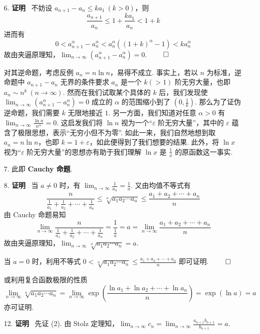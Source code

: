 \documentclass[11pt,oneside,fontset=fandol]{ctexbook} %
\begin{document}
\begin{enumerate}
    \item[6.]
    \textbf{证明} \ 不妨设 $a_{n+1}-a_n \leqslant k a_1 \ (k>0)$，则
    \[
        \frac{a_{n+1}}{a_n} \leqslant 1 + \frac{ka_1}{a_n} < 1 + k
    \]
    进而有
    \[
        0 < a_{n+1}^{\alpha}-a_n^{\alpha} < a_n^{\alpha}\left((1+k)^{\alpha}-1 \right) < k a_n^{\alpha}
    \]
    故由夹逼原理知，$\lim_{n \to \infty} \left(a_{n+1}^{\alpha}-a_n^{\alpha}\right) = 0$.
    $\hfill\qed$

    对其逆命题，考虑反例 $a_n = n \ln n$，易得不成立. 事实上，若以 $n$ 为标准，逆命题中 $a_{n+1} - a_n$ 无界的条件要求 $a_n$ 是一个 $k (> 1)$ 阶无穷大量，也即 $a_n \sim n^k \ (n \to \infty)$. 然而在我们试取某个具体的 $k$ 后，我们发现使 $\lim_{n \to \infty} \left(a_{n+1}^{\alpha}-a_n^{\alpha}\right) = 0$ 成立的 $\alpha$ 的范围缩小到了 $(0, \frac 1 k)$. 那么为了证伪逆命题，我们需要 $k$ 无限地接近 $1$. 另一方面，我们知道对任意 $\alpha > 0$ 有 $\lim_{n \to \infty} \frac{\ln n}{n^\alpha} = 0$. 这启发我们将 $\ln n$ 视为一个“$\varepsilon$ 阶无穷大量”，其中的 $\varepsilon$ 蕴含了极限思想，表示“无穷小但不为零”. 如此一来，我们自然地想到取 $a_n = n \ln n$，也即 $k = 1 + \varepsilon$，如此便得到了我们想要的结果. 此外，将 $\ln x$ 视为“$\varepsilon$ 阶无穷大量”的思想亦有助于我们理解 $\ln x$ 是 $\frac 1 x$ 的原函数这一事实.
    \item[7.]
    此即 \textbf{Cauchy 命题}.
    \item[8.]
    \textbf{证明} \ 当 $a \neq 0$ 时，有 $\lim_{n \to \infty} \frac 1 {a_n} = \frac 1 a$. 又由均值不等式有
    \[
        \frac{n}{\frac 1 {a_1} + \frac 1 {a_2} + \cdots + \frac 1 {a_n}} \leqslant \sqrt[n]{a_1a_2\cdots a_n} \leqslant \frac {a_1+a_2+\cdots+a_n} n
    \]
    由 Cauchy 命题易知
    \[
        \lim_{n \to \infty} \frac{n}{\frac 1 {a_1} + \frac 1 {a_2} + \cdots + \frac 1 {a_n}} = \frac 1 {\frac 1 a} = a = \lim_{n \to \infty} \frac {a_1+a_2+\cdots+a_n} n
    \]
    故由夹逼原理知，$\lim_{n \to \infty} \sqrt[n]{a_1a_2\cdots a_n} = a$.
    
    当 $a = 0$ 时，利用不等式 $0 < \sqrt[n]{a_1a_2\cdots a_n} \leqslant \frac {a_1+a_2+\cdots+a_n} n$ 即可证明.
    $\hfill\qed$

    或利用复合函数极限的性质
    \[
        \lim_{n \to \infty} \sqrt[n]{a_1 a_2 \cdots a_n} = \lim_{n \to \infty} \exp\left( \frac {\ln a_1 + \ln a_2 + \cdots + \ln a_n} n \right) = \exp(\ln a) = a
    \]
    亦可证明.
    \item[12.]
    \textbf{证明} \ 先证 (2). 由 Stolz 定理知，$\lim_{n \to \infty} c_n = \lim_{n\to \infty} \frac{a_{n+1}b_{n+1}}{b_{n+1}} = a$.


\end{enumerate}
\end{document}

